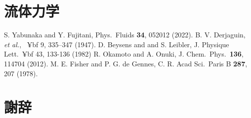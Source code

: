 \documentclass[a4paper,12pt, oneside, openany]{jsbook}
\begin{document}
\chapter{流体力学}


\begin{thebibliography}{9}
 S. Yabunaka and Y. Fujitani, Phys.~Fluids {\bf 34}, 052012 (2022).
 B. V. Derjaguin, {\it et al.\/}, ~{¥bf 9}, 335–347 (1947).
D. Beysens and and S. Leibler, J. Physique Lett.~{¥bf 43}, 133-136 (1982)
  R. Okamoto and A. Onuki, J. Chem.~Phys.~{\bf 136}, 114704 (2012).
M. E. Fisher and P. G. de Gennes, C. R. Acad Sci.~Paris B {\bf 287}, 207 (1978).
\end{thebibliography}

\newpage
{}
\chapter*{謝辞}
\end{document}
